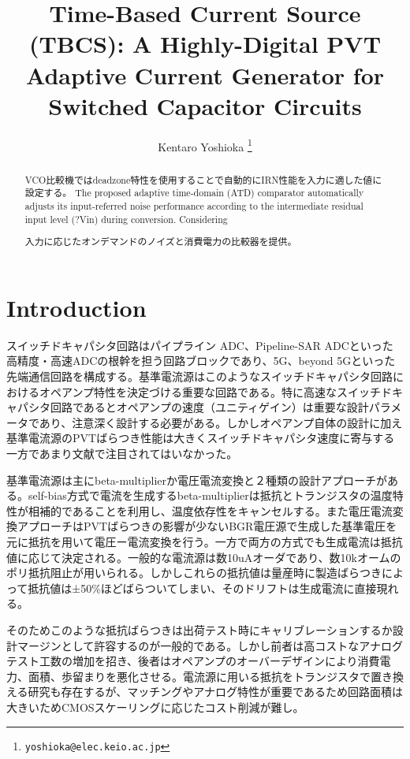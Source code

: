 \documentclass[letterpaper, 10 pt, conference]{ieeeconf}  %
\title{\LARGE \bf
Time-Based Current Source (TBCS): A Highly-Digital PVT Adaptive Current Generator for Switched Capacitor Circuits
}
\author{Kentaro Yoshioka%
\thanks{
        {\tt\small yoshioka@elec.keio.ac.jp}}
}
\begin{document}
\maketitle
\thispagestyle{empty}
\pagestyle{empty}

\begin{abstract}
VCO比較機ではdeadzone特性を使用することで自動的にIRN性能を入力に適した値に設定する。
The proposed adaptive time-domain (ATD) comparator automatically adjusts its input-referred noise performance according to the intermediate residual input level (?Vin) during conversion. Considering

入力に応じたオンデマンドのノイズと消費電力の比較器を提供。


\end{abstract}

\section{Introduction}
スイッチドキャパシタ回路はパイプライン ADC、Pipeline-SAR ADCといった高精度・高速ADCの根幹を担う回路ブロックであり、5G、beyond 5Gといった先端通信回路を構成する\cite{ali201414, ali202012, lagos2018single, hung2020calibration}。基準電流源はこのようなスイッチドキャパシタ回路におけるオペアンプ特性を決定づける重要な回路である。特に高速なスイッチドキャパシタ回路であるとオペアンプの速度（ユニティゲイン）は重要な設計パラメータであり、注意深く設計する必要がある。しかしオペアンプ自体の設計に加え基準電流源のPVTばらつき性能は大きくスイッチドキャパシタ速度に寄与する一方であまり文献で注目されてはいなかった。

基準電流源は主にbeta-multiplierか電圧電流変換と２種類の設計アプローチがある。self-bias方式で電流を生成するbeta-multiplierは抵抗とトランジスタの温度特性が相補的であることを利用し、温度依存性をキャンセルする\cite{azcona2014precision, osipov2016temperature}。また電圧電流変換アプローチはPVTばらつきの影響が少ないBGR電圧源で生成した基準電圧を元に抵抗を用いて電圧ー電流変換を行う\cite{banba1999cmos, ueno2009300}。一方で両方の方式でも生成電流は抵抗値に応じて決定される。一般的な電流源は数10uAオーダであり、数10kオームのポリ抵抗阻止が用いられる。しかしこれらの抵抗値は量産時に製造ばらつきによって抵抗値は±50\%ほどばらついてしまい、そのドリフトは生成電流に直接現れる。

そのためこのような抵抗ばらつきは出荷テスト時にキャリブレーションするか設計マージンとして許容するのが一般的である。しかし前者は高コストなアナログテスト工数の増加を招き、後者はオペアンプのオーバーデザインにより消費電力、面積、歩留まりを悪化させる。電流源に用いる抵抗をトランジスタで置き換える研究も存在するが\cite{hirose2010nano, osaki20131, choi201423pw}、マッチングやアナログ特性が重要であるため回路面積は大きいためCMOSスケーリングに応じたコスト削減が難し。
\end{document}

